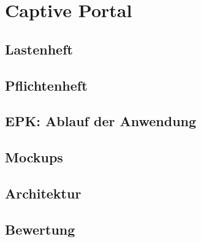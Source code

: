 \section{Captive Portal}

\subsection{Lastenheft}

\subsection{Pflichtenheft}

\subsection{EPK: Ablauf der Anwendung}

\subsection{Mockups}

\subsection{Architektur}

\subsection{Bewertung}
